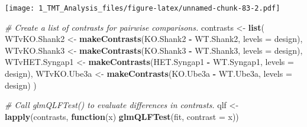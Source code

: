 \documentclass[]{article}
\newenvironment{Shaded}{\begin{snugshade}}{\end{snugshade}}
\newcommand{\KeywordTok}[1]{\textcolor[rgb]{0.13,0.29,0.53}{\textbf{#1}}}
\newcommand{\DataTypeTok}[1]{\textcolor[rgb]{0.13,0.29,0.53}{#1}}
\newcommand{\StringTok}[1]{\textcolor[rgb]{0.31,0.60,0.02}{#1}}
\newcommand{\CommentTok}[1]{\textcolor[rgb]{0.56,0.35,0.01}{\textit{#1}}}
\newcommand{\ControlFlowTok}[1]{\textcolor[rgb]{0.13,0.29,0.53}{\textbf{#1}}}
\newcommand{\OperatorTok}[1]{\textcolor[rgb]{0.81,0.36,0.00}{\textbf{#1}}}
\newcommand{\NormalTok}[1]{#1}
\begin{document}
\texttt{[image: 1\_TMT\_Analysis\_files/figure-latex/unnamed-chunk-83-2.pdf]}

\begin{Shaded}
\begin{Highlighting}[]
\CommentTok{# Create a list of contrasts for pairwise comparisons.}
\NormalTok{contrasts <-}\StringTok{ }\KeywordTok{list}\NormalTok{(}
\NormalTok{  WTvKO.Shank2 <-}\StringTok{ }\KeywordTok{makeContrasts}\NormalTok{(KO.Shank2 }\OperatorTok{-}\StringTok{ }\NormalTok{WT.Shank2, }\DataTypeTok{levels =}\NormalTok{ design),}
\NormalTok{  WTvKO.Shank3 <-}\StringTok{ }\KeywordTok{makeContrasts}\NormalTok{(KO.Shank3 }\OperatorTok{-}\StringTok{ }\NormalTok{WT.Shank3, }\DataTypeTok{levels =}\NormalTok{ design),}
\NormalTok{  WTvHET.Syngap1 <-}\StringTok{ }\KeywordTok{makeContrasts}\NormalTok{(HET.Syngap1 }\OperatorTok{-}\StringTok{ }\NormalTok{WT.Syngap1, }\DataTypeTok{levels =}\NormalTok{ design),}
\NormalTok{  WTvKO.Ube3a <-}\StringTok{ }\KeywordTok{makeContrasts}\NormalTok{(KO.Ube3a }\OperatorTok{-}\StringTok{ }\NormalTok{WT.Ube3a, }\DataTypeTok{levels =}\NormalTok{ design)}
\NormalTok{)}

\CommentTok{# Call glmQLFTest() to evaluate differences in contrasts.}
\NormalTok{qlf <-}\StringTok{ }\KeywordTok{lapply}\NormalTok{(contrasts, }\ControlFlowTok{function}\NormalTok{(x) }\KeywordTok{glmQLFTest}\NormalTok{(fit, }\DataTypeTok{contrast =}\NormalTok{ x))}


\end{Highlighting}
\end{Shaded}
\end{document}
